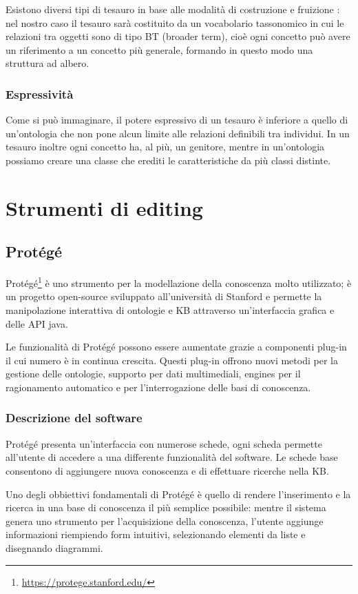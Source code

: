 Esistono diversi tipi di tesauro in base alle modalità di costruzione e fruizione \cite{kilgarriff2000s}: nel nostro caso il tesauro sarà costituito da un vocabolario tassonomico in cui le relazioni tra oggetti sono di tipo BT (broader term), cioè ogni concetto può avere un riferimento a un concetto più generale, formando in questo modo una struttura ad albero. 
\subsubsection{Espressività}
Come si può immaginare, il potere espressivo di un tesauro è inferiore a quello di un'ontologia che non pone alcun limite alle relazioni definibili tra individui. In un tesauro inoltre ogni concetto ha, al più, un genitore, mentre in un'ontologia possiamo creare una classe che erediti le caratteristiche da più classi distinte.
\section{Strumenti di editing}

\subsection{Protégé}
Protégé\footnote{\url{https://protege.stanford.edu/}} è uno strumento per la modellazione della conoscenza molto utilizzato; è un progetto open-source sviluppato all'università di Stanford e permette la manipolazione interattiva di ontologie e KB attraverso un'interfaccia grafica e delle API java.

Le funzionalità di Protégé possono essere aumentate grazie a componenti plug-in il cui numero è in continua crescita. Questi plug-in offrono nuovi metodi per la gestione delle ontologie, supporto per dati multimediali, engines per il ragionamento automatico e per l'interrogazione delle basi di conoscenza\cite{sivakumar2011ontology}.
\subsubsection{Descrizione del software}
Protégé presenta un'interfaccia con numerose schede, ogni scheda permette all'utente di accedere a una differente funzionalità del software. Le schede base consentono di aggiungere nuova conoscenza e di effettuare ricerche nella KB.

Uno degli obbiettivi fondamentali di Protégé è quello di rendere l'inserimento e la ricerca in una base di conoscenza il più semplice possibile: mentre il sistema genera uno strumento per l'acquisizione della conoscenza, l'utente aggiunge informazioni riempiendo form intuitivi, selezionando elementi da liste e disegnando diagrammi.


